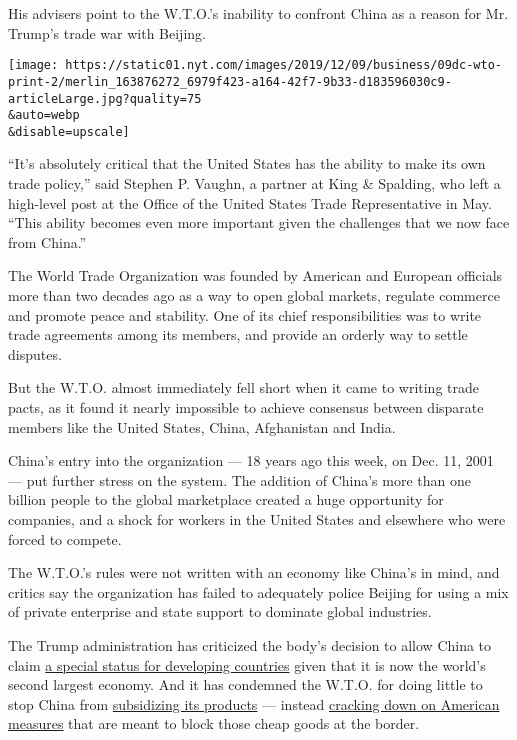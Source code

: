 His advisers point to the W.T.O.'s inability to confront China as a
reason for Mr. Trump's trade war with Beijing.

\texttt{[image: https://static01.nyt.com/images/2019/12/09/business/09dc-wto-print-2/merlin\_163876272\_6979f423-a164-42f7-9b33-d183596030c9-articleLarge.jpg?quality=75\\\&auto=webp\\\&disable=upscale]}

``It's absolutely critical that the United States has the ability to
make its own trade policy,'' said Stephen P. Vaughn, a partner at King
\& Spalding, who left a high-level post at the Office of the United
States Trade Representative in May. ``This ability becomes even more
important given the challenges that we now face from China.''

The World Trade Organization was founded by American and European
officials more than two decades ago as a way to open global markets,
regulate commerce and promote peace and stability. One of its chief
responsibilities was to write trade agreements among its members, and
provide an orderly way to settle disputes.

But the W.T.O. almost immediately fell short when it came to writing
trade pacts, as it found it nearly impossible to achieve consensus
between disparate members like the United States, China, Afghanistan and
India.

China's entry into the organization --- 18 years ago this week, on Dec.
11, 2001 --- put further stress on the system. The addition of China's
more than one billion people to the global marketplace created a huge
opportunity for companies, and a shock for workers in the United States
and elsewhere who were forced to compete.

The W.T.O.'s rules were not written with an economy like China's in
mind, and critics say the organization has failed to adequately police
Beijing for using a mix of private enterprise and state support to
dominate global industries.

The Trump administration has criticized the body's decision to allow
China to claim
\href{https://www.nytimes.com/2019/07/26/us/politics/trump-wto-china.html}{a
special status for developing countries} given that it is now the
world's second largest economy. And it has condemned the W.T.O. for
doing little to stop China from
\href{https://www.nytimes.com/2019/05/12/business/china-trump-trade-subsidies.html}{subsidizing
its products} --- instead
\href{https://www.nytimes.com/2019/11/01/business/wto-china-us-trade.html}{cracking
down on American measures} that are meant to block those cheap goods at
the border.

